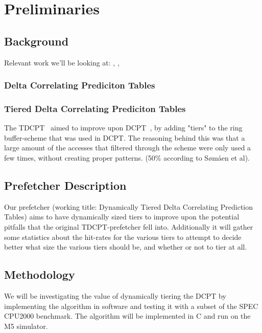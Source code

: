 \section{Preliminaries}

\subsection{Background}

Relevant work we'll be looking at: \cite{Grannaes355273}, \cite{Grannaes481837}, \cite{Jahre355239}

\subsubsection{Delta Correlating Prediciton Tables}

\subsubsection{Tiered Delta Correlating Prediciton Tables}

The TDCPT~\cite{Somaen} aimed to improve upon DCPT~\cite{Grannaes481837}, by
adding "tiers" to the ring buffer-scheme that was used in DCPT. The reasoning
behind this was that a large amount of the accesses that filtered through the
scheme were only used a few times, without creating proper patterns. (50\%
according to Sømåen et al).



\subsection{Prefetcher Description}

Our prefetcher (working title: Dynamically Tiered Delta Correlating Prediction
Tables) aims to have dynamically sized tiers to improve upon the potential
pitfalls that the original TDCPT-prefetcher fell into. Additionally it will
gather some statistics about the hit-rates for the various tiers to attempt to
decide better what size the various tiers should be, and whether or not to tier
at all.


\subsection{Methodology}

We will be investigating the value of dynamically tiering the DCPT by
implementing the algorithm in software and testing it with a subset of the SPEC
CPU2000 benchmark.  The algorithm will be implemented in C and run on the M5
simulator.
